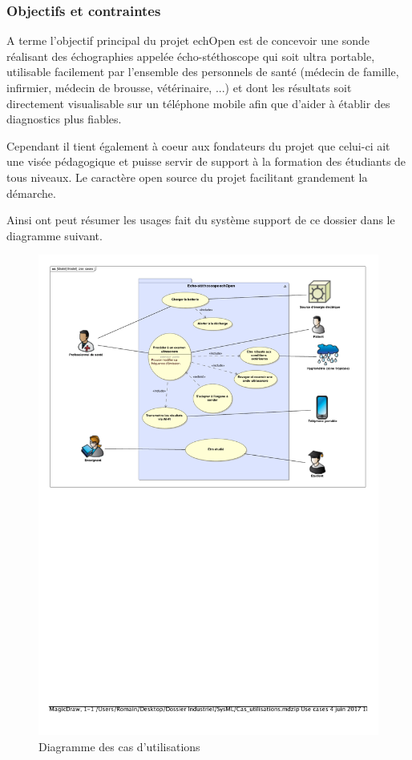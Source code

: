 \documentclass[12pt]{article}
\begin{document}
\subsubsection{Objectifs et contraintes}
\vspace{10pt}
A terme l'objectif principal du projet echOpen est de concevoir une sonde réalisant des échographies appelée écho-stéthoscope qui soit ultra portable, utilisable facilement par l'ensemble des personnels de santé (médecin de famille, infirmier, médecin de brousse, vétérinaire, ...) et dont les résultats soit directement visualisable sur un téléphone mobile afin que d'aider à établir des diagnostics plus fiables. \par 
Cependant il tient également à coeur aux fondateurs du projet que celui-ci ait une visée pédagogique et puisse servir de support à la formation des étudiants de tous niveaux. Le caractère open source du projet facilitant grandement la démarche.\par 
Ainsi ont peut résumer les usages fait du système support de ce dossier dans le diagramme suivant.\par


\vspace{20pt}
\begin{figure}[!h]
\hspace{-20pt}
\includegraphics[width=19cm,trim=0cm 15cm 0cm 0cm, clip=true]{Images_Rapport/utilisations_pdf} 
\caption{Diagramme des cas d'utilisations}
\end{figure}
\end{document}
